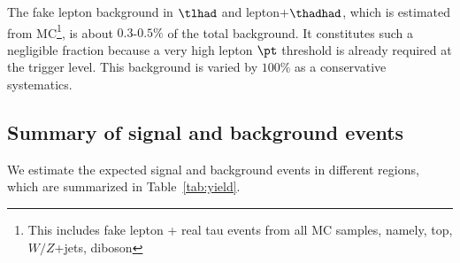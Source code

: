 The fake lepton background in $\tlhad$ and lepton+$\thadhad$, which is estimated from MC\footnote{This includes fake lepton + real tau events
from all MC samples, namely, top, $W/Z$+jets, diboson}, is about $0.3$-$0.5\%$ of the total background. It constitutes
such a negligible fraction because a very high lepton $\pt$ threshold is already required at the trigger level. This
background is varied by $100\%$ as a conservative systematics.

\subsection{Summary of signal and background events}
\label{sec:background_hadhad}

We estimate the expected signal and background events in different regions, which are summarized in Table~\ref{tab:yield}. 


